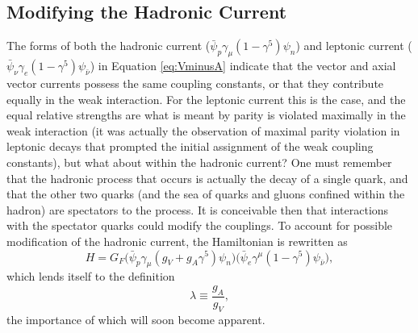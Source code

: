 
\subsection{Modifying the Hadronic Current}

The forms of both the hadronic current ($\bar{\psi}_p \gamma_\mu(1-\gamma^5)\psi_n$) and
leptonic current ($\bar{\psi}_\nu \gamma_e(1-\gamma^5)\psi_{\bar{\nu}}$) in Equation \ref{eq:VminusA} indicate
that the vector and axial vector currents possess the same coupling constants, or that
they contribute equally in the weak interaction. For the leptonic current this is the case,
and the equal relative strengths are
what is meant by parity is violated maximally in the weak interaction (it was actually the observation of
maximal parity violation in leptonic decays that prompted the initial assignment of the weak coupling
constants), but what about within the
hadronic current? One must remember that the hadronic process that occurs is actually the decay
of a single quark, and that the other two quarks (and the sea of quarks and gluons confined within the hadron)
are spectators to the process. 
It is conceivable then that interactions with the spectator quarks could modify the couplings.
To account for possible modification of the hadronic current, the
Hamiltonian is rewritten as
%
\begin{equation} 
  H = G_F \Big(\bar{\psi}_p \gamma_\mu(g_V+g_A\gamma^5)\psi_n \Big)\Big(\bar{\psi}_{e} \gamma^\mu(1-\gamma^5)\psi_{\bar{\nu}} \Big),
  \label{eq:VminusA2}
\end{equation}
%
which lends itself to the definition
%
\begin{equation}
  \lambda \equiv \frac{g_A}{g_V},
\end{equation}
the importance of which will soon become apparent.

